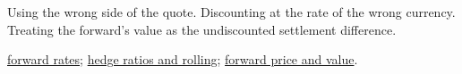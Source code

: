 \begin{qfmethod}
 Using the wrong side of the quote. Discounting at the rate of the wrong currency. Treating the forward's value as the undiscounted settlement difference.

 \hyperref[meth:cross-forward-rates]{forward rates}; \hyperref[meth:currency-hedging-programme]{hedge ratios and rolling}; \hyperref[meth:forward-price-value-lifecycle]{forward price and value}.

\end{qfmethod}
